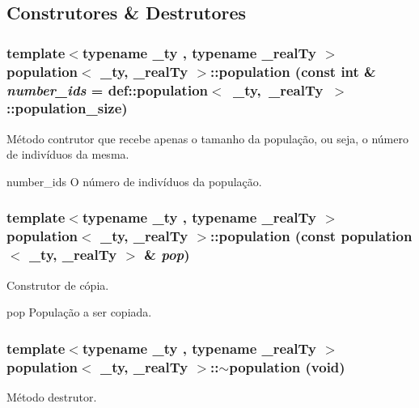 \subsection{Construtores \& Destrutores}
\hypertarget{classpopulation_aa497c7bcf82ec82f15cf0ca41f29c153}{
\subsubsection[{population}]{\setlength{\rightskip}{0pt plus 5cm}template$<$typename \_\-ty , typename \_\-realTy $>$ {\bf population}$<$ \_\-ty, \_\-realTy $>$::{\bf population} (const int \& {\em number\_\-ids} = {\ttfamily def::population$<$~\_\-ty,~\_\-realTy~$>$::population\_\-size})}}
\label{classpopulation_aa497c7bcf82ec82f15cf0ca41f29c153}
Método contrutor que recebe apenas o tamanho da população, ou seja, o número de indivíduos da mesma.

number\_\-ids O número de indivíduos da população. \hypertarget{classpopulation_ab7b5dad1173b0da5b177e6253b66a071}{
\subsubsection[{population}]{\setlength{\rightskip}{0pt plus 5cm}template$<$typename \_\-ty , typename \_\-realTy $>$ {\bf population}$<$ \_\-ty, \_\-realTy $>$::{\bf population} (const {\bf population}$<$ \_\-ty, \_\-realTy $>$ \& {\em pop})}}
\label{classpopulation_ab7b5dad1173b0da5b177e6253b66a071}
Construtor de cópia.

pop População a ser copiada. \hypertarget{classpopulation_a735c7c86f92155f0deb6034432086d37}{
\subsubsection[{$\sim$population}]{\setlength{\rightskip}{0pt plus 5cm}template$<$typename \_\-ty , typename \_\-realTy $>$ {\bf population}$<$ \_\-ty, \_\-realTy $>$::$\sim${\bf population} (void)}}
\label{classpopulation_a735c7c86f92155f0deb6034432086d37}
Método destrutor. 

